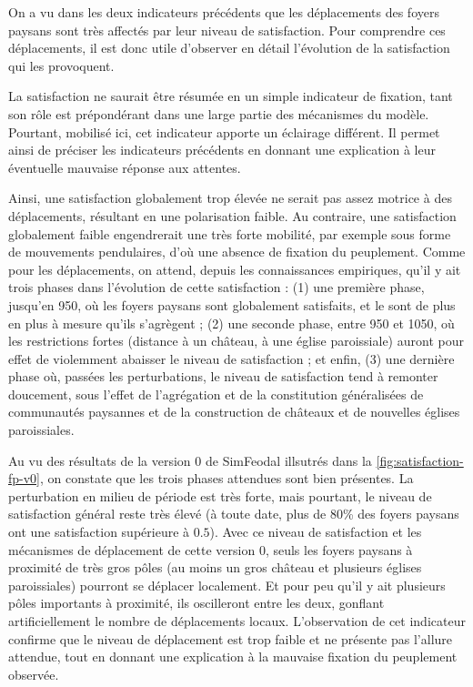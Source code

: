 On a vu dans les deux indicateurs précédents que les déplacements des foyers paysans sont très affectés par leur niveau de satisfaction.
Pour comprendre ces déplacements, il est donc utile d'observer en détail l'évolution de la satisfaction qui les provoquent.

La satisfaction ne saurait être résumée en un simple indicateur de fixation, tant son rôle est prépondérant dans une large partie des mécanismes du modèle.
Pourtant, mobilisé ici, cet indicateur apporte un éclairage différent.
Il permet ainsi de préciser les indicateurs précédents en donnant une explication à leur éventuelle mauvaise réponse aux attentes.

Ainsi, une satisfaction globalement trop élevée ne serait pas assez motrice à des déplacements, résultant en une polarisation faible.
Au contraire, une satisfaction globalement faible engendrerait une très forte mobilité, par exemple sous forme de mouvements pendulaires, d'où une absence de fixation du peuplement.
Comme pour les déplacements, on attend, depuis les connaissances empiriques, qu'il y ait trois phases dans l'évolution de cette satisfaction :
(1) une première phase, jusqu'en 950, où les foyers paysans sont globalement satisfaits, et le sont de plus en plus à mesure qu'ils s'agrègent ;
(2) une seconde phase, entre 950 et 1050, où les restrictions fortes (distance à un château, à une église paroissiale) auront pour effet de violemment abaisser le niveau de satisfaction ;
et enfin, (3) une dernière phase où, passées les perturbations, le niveau de satisfaction tend à remonter doucement, sous l'effet de l'agrégation et de la constitution généralisées de communautés paysannes et de la construction de châteaux et de nouvelles églises paroissiales.

\begin{mdframed}[backgroundcolor=gray!10,footnoteinside=false]
Au vu des résultats de la version 0 de SimFeodal illsutrés dans la \cref{fig:satisfaction-fp-v0}, on constate que les trois phases attendues sont bien présentes.
La perturbation en milieu de période est très forte, mais pourtant, le niveau de satisfaction général reste très élevé (à toute date, plus de $80$\% des foyers paysans ont une satisfaction supérieure à $0.5$).
Avec ce niveau de satisfaction et les mécanismes de déplacement de cette version 0, seuls les foyers paysans à proximité de très gros pôles (au moins un gros château et plusieurs églises paroissiales) pourront se déplacer localement.
Et pour peu qu'il y ait plusieurs pôles importants à proximité, ils oscilleront entre les deux, gonflant artificiellement le nombre de déplacements locaux.
L'observation de cet indicateur confirme que le niveau de déplacement est trop faible et ne présente pas l'allure attendue, tout en donnant une explication à la mauvaise fixation du peuplement observée.
\end{mdframed}

